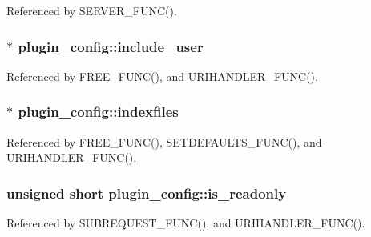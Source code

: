 Referenced by S\-E\-R\-V\-E\-R\-\_\-\-F\-U\-N\-C().

\hypertarget{structplugin__config_a2f69bbbd86f6e71a68d83ea7584f5992}{
\subsubsection[{include\-\_\-user}]{$\ast$ plugin\-\_\-config\-::include\-\_\-user}}\label{structplugin__config_a2f69bbbd86f6e71a68d83ea7584f5992}


Referenced by F\-R\-E\-E\-\_\-\-F\-U\-N\-C(), and U\-R\-I\-H\-A\-N\-D\-L\-E\-R\-\_\-\-F\-U\-N\-C().

\hypertarget{structplugin__config_ad3deb44ffab7392c14dcf06c9336d094}{
\subsubsection[{indexfiles}]{$\ast$ plugin\-\_\-config\-::indexfiles}}\label{structplugin__config_ad3deb44ffab7392c14dcf06c9336d094}


Referenced by F\-R\-E\-E\-\_\-\-F\-U\-N\-C(), S\-E\-T\-D\-E\-F\-A\-U\-L\-T\-S\-\_\-\-F\-U\-N\-C(), and U\-R\-I\-H\-A\-N\-D\-L\-E\-R\-\_\-\-F\-U\-N\-C().

\hypertarget{structplugin__config_ae310e81d2c5196b21c0b47ef25dfd8c0}{
\subsubsection[{is\-\_\-readonly}]{\setlength{\rightskip}{0pt plus 5cm}unsigned short plugin\-\_\-config\-::is\-\_\-readonly}}\label{structplugin__config_ae310e81d2c5196b21c0b47ef25dfd8c0}


Referenced by S\-U\-B\-R\-E\-Q\-U\-E\-S\-T\-\_\-\-F\-U\-N\-C(), and U\-R\-I\-H\-A\-N\-D\-L\-E\-R\-\_\-\-F\-U\-N\-C().

